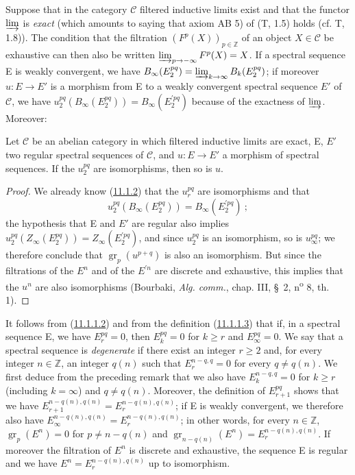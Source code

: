 \begin{env}[11.1.4]
\label{0.11.1.4}
Suppose that in the category $\mathcal C$ filtered inductive limits
exist and that the functor $\varinjlim$ is \emph{exact} (which amounts to
saying that axiom AB 5) of (T, 1.5) holds (cf. T, 1.8)). The condition
that the filtration $(F^p(X))_{p\in\mathbb Z}$ of an object $X\in\mathcal C$ be
exhaustive can then also be written
$\varinjlim_{p\to-\infty}F^p(X)=X$. If a spectral sequence E is weakly
convergent, we have
$B_\infty(E_2^{pq})=\varinjlim_{k\to\infty}B_k(E_2^{pq})$; if moreover
$u:E\to E'$ is a morphism from E to a weakly convergent spectral sequence $E'$ of
$\mathcal C$, we have
$u_2^{pq}(B_\infty(E_2^{pq}))=B_\infty(E_2^{\prime pq})$ because of
the exactness of $\varinjlim$. Moreover:
\end{env}

\begin{proposition}[11.1.5]
\label{0.11.1.5}
Let $\mathcal C$ be an abelian category in which filtered inductive limits
are exact, E, $E'$ two regular spectral sequences
of $\mathcal C$, and $u:E\to E'$ a morphism of spectral sequences. If the
$u_2^{pq}$ are isomorphisms, then so is $u$.
\end{proposition}

\begin{proof}
We already know (\hyperref[0.11.1.2]{11.1.2}) that the $u_r^{pq}$ are
isomorphisms and that
\[
  u_2^{pq}(B_\infty(E_2^{pq}))=B_\infty(E_2^{\prime pq})~;
\]
the hypothesis that E and $E'$ are regular also implies
$u_2^{pq}(Z_\infty(E_2^{pq}))=Z_\infty(E_2^{\prime pq})$, and since
$u_2^{pq}$ is an isomorphism, so is $u_\infty^{pq}$; we therefore
conclude that $\operatorname{gr}_p(u^{p+q})$ is also an isomorphism.
But since the filtrations of the $E^n$ and of the $E^{\prime n}$ are discrete and
exhaustive, this implies that the $u^n$ are also isomorphisms
(Bourbaki, \emph{Alg. comm.}, chap. III, \S~2, n\textsuperscript{o} 8,
th. 1).
\end{proof}

\begin{env}[11.1.6]
\label{0.11.1.6}
It follows from (\hyperref[0.11.1.1.2]{11.1.1.2}) and from the definition
(\hyperref[0.11.1.1.3]{11.1.1.3}) that if, in a spectral sequence E, we have
$E_r^{pq}=0$, then $E_k^{pq}=0$ for $k\geq r$ and $E_\infty^{pq}=0$. We say
that a spectral sequence is \emph{degenerate} if there exist an integer $r\geq2$ and,
for every integer $n\in\mathbb Z$, an integer $q(n)$ such that
$E_r^{n-q,q}=0$ for every $q\ne q(n)$. We first deduce from the preceding
remark that we also have $E_k^{n-q,q}=0$ for $k\geq r$ (including
$k=\infty$) and $q\ne q(n)$. Moreover, the definition of $E_{r+1}^{pq}$ shows
that we have
$E_{r+1}^{n-q(n),q(n)}=E_r^{n-q(n),q(n)}$; if E is weakly convergent,
we therefore also have
$E_\infty^{n-q(n),q(n)}=E_r^{n-q(n),q(n)}$; in other words, for every
$n\in\mathbb Z$, $\operatorname{gr}_p(E^n)=0$ for $p\ne n-q(n)$ and
$\operatorname{gr}_{n-q(n)}(E^n)=E_r^{n-q(n),q(n)}$. If moreover the filtration
of $E^n$ is discrete and exhaustive, the sequence E is regular and we have
$E^n=E_r^{n-q(n),q(n)}$ up to isomorphism.
\end{env}

